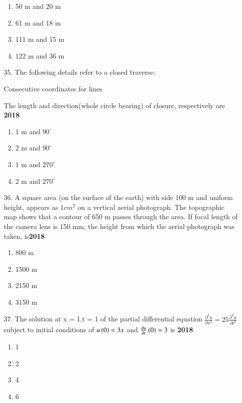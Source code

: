 \documentclass[journal]{IEEEtran}
\begin{document}
\begin{enumerate}
\begin{enumerate}[label=(\Alph*)]
        \item 50 m and 20 m 
        \item 61 m and 18 m 
        \item 111 m and 15 m 
        \item 122 m and 36 m  
    \end{enumerate}
    \item[35.]The following details refer to a closed traverse:
    \begin{table}[h!]
        \centering
        
        \caption{Consecutive coordinates for lines}
    \end{table}
    The length and direction(whole circle bearing) of closure, respectively are \hfill \textbf{2018}
    \begin{enumerate}[label=(\Alph*)]
        \item 1 m and $90^{\circ}$
        \item 2 m and $90^{\circ}$
        \item 1 m and $270^{\circ}$
        \item 2 m and $270^{\circ}$
    \end{enumerate}
    \item[36.] A square area (on the surface of the earth) with side 100 m and uniform height, appears as
    $1 cm^2$ on a vertical aerial photograph. The topographic map shows that a contour of 650 m
    passes through the area. If focal length of the camera lens is 150 mm, the height from
    which the aerial photograph was taken, is\hfill \textbf{2018}
    \begin{enumerate}[label=(\Alph*)]
        \item 800 m 
        \item 1500 m 
        \item 2150 m 
        \item 3150 m 
    \end{enumerate}
    \item[37.]The solution at x = 1,t = 1 of the partial differential equation $\frac{\partial ^2 u}{\partial x^2} = 25\frac{\partial^2u}{\partial t^2}$ subject to initial conditions of $u\left(0\right) = 3x$ and $\frac{\partial u}{\partial t}\left(0\right)=3$ is \hfill \textbf{2018}
    \begin{enumerate}[label=(\Alph*)]
        \item 1
        \item 2
        \item 4
        \item 6

\end{enumerate}
\end{enumerate}
\end{document}
